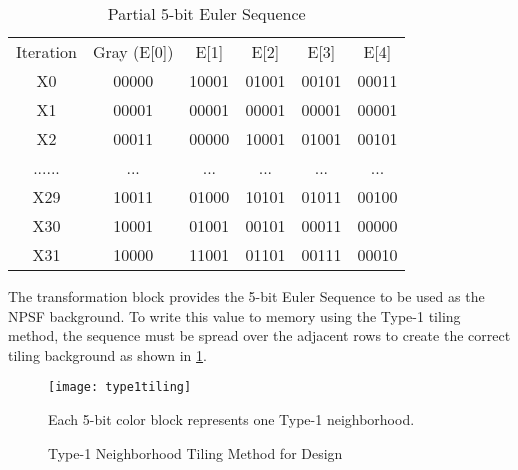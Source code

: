 \begin{table}[H]
  \caption{Partial 5-bit Euler Sequence}
  \centering
  \begin{tabular}{c c c c c c}
  \hline\hline
  Iteration    & Gray (E[0]) & E[1]  & E[2]  & E[3]  & E[4]  \\
  X0  & 00000 & 10001 & 01001 & 00101 & 00011 \\
  X1  & 00001 & 00001 & 00001 & 00001 & 00001 \\
  X2  & 00011 & 00000 & 10001 & 01001 & 00101 \\
  ......             & ...   & ...   & ...   & ...   & ...   \\
  X29 & 10011 & 01000 & 10101 & 01011 & 00100 \\
  X30 & 10001 & 01001 & 00101 & 00011 & 00000 \\
  X31 & 10000 & 11001 & 01101 & 00111 & 00010 \\ [0.5ex]
  \end{tabular}
  \label{tab:euler}
\end{table}

The transformation block provides the 5-bit Euler Sequence to be used as the NPSF background.  To write this value to memory using the Type-1 tiling method, the sequence must be spread over the adjacent rows to create the correct tiling background as shown in \ref{fig:tiling}.  

\begin{figure}[H]
  \centering
  \texttt{[image: type1tiling]}
  \caption[Type-1 Neighborhood Tiling Method for Design]{Type-1 Neighborhood Tiling Method for Design}  
   Each 5-bit color block represents one Type-1 neighborhood.
  \label{fig:tiling}
\end{figure}


